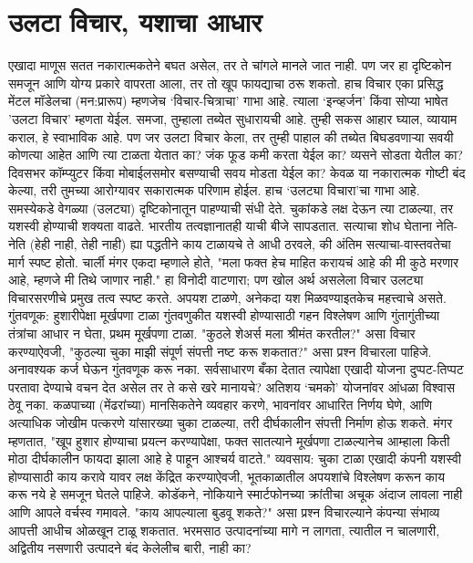 \chapter{उलटा विचार, यशाचा आधार}

एखादा माणूस सतत नकारात्मकतेने बघत असेल, तर ते चांगले मानले जात नाही. पण जर हा दृष्टिकोन समजून आणि योग्य प्रकारे वापरता आला, तर तो खूप फायद्याचा ठरू शकतो. हाच विचार एका प्रसिद्ध मेंटल मॉडेलचा (मन:प्रारूप) म्हणजेच ‘विचार-चित्राचा’ गाभा आहे. त्याला ‘इन्व्हर्जन’ किंवा सोप्या भाषेत 'उलटा विचार' म्हणता येईल.  समजा, तुम्हाला तब्येत सुधारायची आहे. तुम्ही सकस आहार घ्याल, व्यायाम कराल, हे स्वाभाविक आहे. पण जर उलटा विचार केला, तर तुम्ही पाहाल की तब्येत बिघडवणाऱ्या सवयी कोणत्या आहेत आणि त्या टाळता येतात का? जंक फूड कमी करता येईल का? व्यसने सोडता येतील का? दिवसभर कॉम्प्युटर किंवा मोबाईलसमोर बसण्याची सवय मोडता येईल का? केवळ या नकारात्मक गोष्टी बंद केल्या, तरी तुमच्या आरोग्यावर सकारात्मक परिणाम होईल. हाच ‘उलट्या विचारा’चा गाभा आहे. समस्येकडे वेगळ्या (उलट्या) दृष्टिकोनातून पाहण्याची संधी देते. चुकांकडे लक्ष देऊन त्या टाळल्या, तर यशस्वी होण्याची शक्यता वाढते.  भारतीय तत्वज्ञानातही याची बीजे सापडतात. सत्याचा शोध घेताना नेति-नेति (हेही नाही, तेही नाही) ह्या पद्धतीने काय टाळायचे ते आधी ठरवले, की अंतिम सत्याचा-वास्तवतेचा मार्ग स्पष्ट होतो.  चार्ली मंगर एकदा म्हणाले होते, "मला फक्त हेच माहित करायचं आहे की मी कुठे मरणार आहे, म्हणजे मी तिथे जाणार नाही." हा विनोदी वाटणारा; पण खोल अर्थ असलेला विचार उलट्या विचारसरणीचे प्रमुख तत्व स्पष्ट करते. अपयश टाळणे, अनेकदा यश मिळवण्याइतकेच महत्त्वाचे असते.  
गुंतवणूक: हुशारीपेक्षा मूर्खपणा टाळा
गुंतवणुकीत यशस्वी होण्यासाठी गहन विश्लेषण आणि गुंतागुंतीच्या तंत्रांचा आधार न घेता, प्रथम मूर्खपणा टाळा. "कुठले शेअर्स मला श्रीमंत करतील?" असा विचार करण्याऐवजी, "कुठल्या चुका माझी संपूर्ण संपत्ती नष्ट करू शकतात?" असा प्रश्न विचारला पाहिजे. अनावश्यक कर्ज घेऊन गुंतवणूक करू नका. सर्वसाधारण बँका देतात त्यापेक्षा एखादी योजना दुप्पट-तिप्पट परतावा देण्याचे वचन देत असेल तर ते कसे खरे मानायचे? अतिशय ‘चमको’ योजनांवर आंधळा विश्वास ठेवू नका. कळपाच्या (मेंढरांच्या) मानसिकतेने व्यवहार करणे, भावनांवर आधारित निर्णय घेणे, आणि अत्याधिक जोखीम पत्करणे यांसारख्या चुका टाळल्या, तरी दीर्घकालीन संपत्ती निर्माण होऊ शकते.  मंगर म्हणतात, "खूप हुशार होण्याचा प्रयत्न करण्यापेक्षा, फक्त सातत्याने मूर्खपणा टाळल्यानेच आम्हाला किती मोठा दीर्घकालीन फायदा झाला आहे हे पाहून आश्चर्य वाटते."
व्यवसाय: चुका टाळा  
एखादी कंपनी यशस्वी होण्यासाठी काय करावे यावर लक्ष केंद्रित करण्याऐवजी, भूतकाळातील अपयशांचे विश्लेषण करून काय करू नये हे समजून घेतले पाहिजे. कोडॅकने, नोकियाने स्मार्टफोनच्या क्रांतीचा अचूक अंदाज लावला नाही आणि आपले वर्चस्व गमावले. "काय आपल्याला बुडवू शकते?" असा प्रश्न विचारल्याने कंपन्या संभाव्य आपत्ती आधीच ओळखून टाळू शकतात. भरमसाठ उत्पादनांच्या मागे न लागता, त्यातील न चालणारी, अद्वितीय नसणारी उत्पादने बंद केलेलीच बारी, नाही का?
